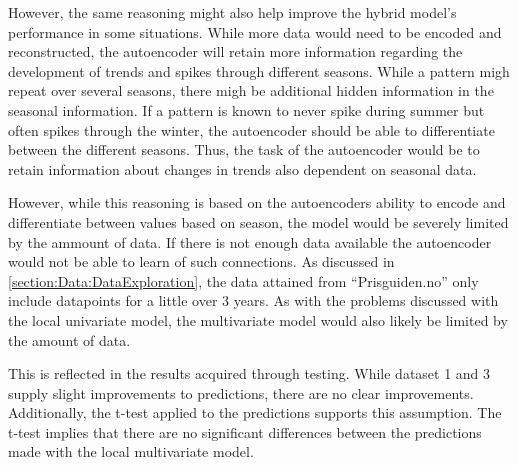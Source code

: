 However, the same reasoning might also help improve the hybrid model's performance in some situations.
While more data would need to be encoded and reconstructed, the autoencoder will retain more information
regarding the development of trends and spikes through different seasons.
While a pattern migh repeat over several seasons, there migh be additional hidden information in the seasonal information.
If a pattern is known to never spike during summer but often spikes through the winter,
the autoencoder should be able to differentiate between the different seasons.
Thus, the task of the autoencoder would be to retain information about changes in trends also dependent on seasonal data.


However, while this reasoning is based on the autoencoders ability to encode and differentiate between values based on season,
the model would be severely limited by the ammount of data.
If there is not enough data available the autoencoder would not be able to learn of such connections.
As discussed in \cref{section:Data:DataExploration}, the data attained from ``Prisguiden.no'' only include datapoints
for a little over 3 years.
As with the problems discussed with the local univariate model, the multivariate model would also likely be limited by the amount of data.

This is reflected in the results acquired through testing.
While dataset 1 and 3 supply slight improvements to predictions, there are no clear improvements.
Additionally, the t-test applied to the predictions supports this assumption.
The t-test implies that there are no significant differences between the predictions made with the local multivariate model.


